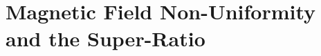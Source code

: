 \appendix
\addappheadtotoc
\chapter{Magnetic Field Non-Uniformity and the Super-Ratio}
\label{app:MagField}

